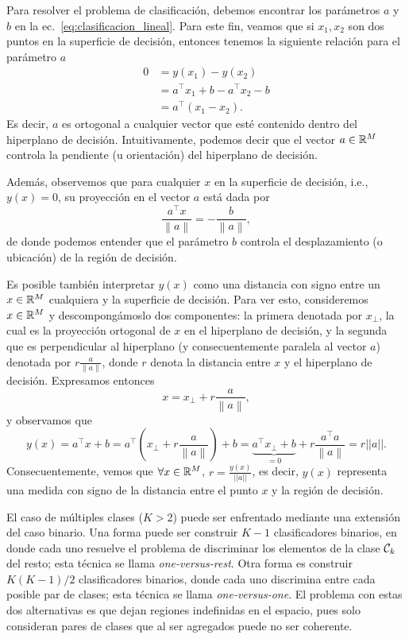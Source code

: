 Para resolver el problema de clasificación, debemos encontrar los parámetros $a$ y $b$ en la ec.~\eqref{eq:clasificacion_lineal}. Para este fin, veamos que si $x_1,x_2$ son dos puntos en la superficie de decisión, entonces tenemos la siguiente relación para el parámetro $a$
\begin{align}
	0 &= y(x_1) - y(x_2) \nonumber\\
	  &= a^\top x_1 + b - a^\top x_2 - b \nonumber\\
	  &= a^\top (x_1-x_2).
\end{align}
Es decir, $a$ es ortogonal a cualquier vector que esté contenido dentro del hiperplano de decisión. Intuitivamente, podemos decir que el vector $a\in{\mathbb R}^M$ controla la pendiente (u orientación) del hiperplano de decisión.

Además, observemos que para cualquier $x$ en la superficie de decisión, i.e., $y(x)=0$,  su proyección en el vector $a$ está dada por  
\begin{equation}
	\frac{a^\top x}{\left \| a \right \|} = -\frac{b}{\left \| a \right \|},
\end{equation}
de donde podemos entender que el parámetro $b$ controla el desplazamiento (o ubicación) de la región de decisión.

Es posible  también interpretar $y(x)$ como una distancia con signo entre un $x\in{\mathbb R}^M$ cualquiera  y la superficie de decisión. Para ver esto, consideremos $x\in{\mathbb R}^M$ y descompongámoslo dos componentes: la primera denotada por $x_{\bot}$, la cual es la proyección ortogonal de $x$ en el hiperplano de  decisión, y la segunda que es perpendicular al hiperplano (y consecuentemente paralela al vector $a$) denotada por $r\frac{a}{\left \| a \right \|}$, donde $r$ denota la distancia entre $x$ y el  hiperplano de  decisión. Expresamos entonces  
\begin{equation}
	x = x_{\bot}+r\frac{a}{\left \| a \right \|},
\end{equation}
y observamos que
\begin{equation}
	y(x) 
	= a^\top x+b 
	=a^\top  \left( x_{\bot} + r\frac{a}{\left \| a \right \|} \right) +b 
	= \underbrace{a^\top x_{\bot} +b }_{=0} +   r\frac{a^\top  a}{\left \| a \right \|}
	= r||a||.
\end{equation}
Consecuentemente, vemos que $\forall x\in{\mathbb R}^M$, $r = \frac{y(x)}{||a||}$,  es decir, $y(x)$ representa una medida con signo de la  distancia entre el punto $x$ y la  región de decisión. 

El caso de múltiples clases ($K>2$) puede ser enfrentado mediante una extensión del caso binario. Una forma puede ser construir $K-1$ clasificadores binarios, en donde cada uno  resuelve el problema de discriminar los elementos de la  clase ${\mathcal C}_k$ del resto; esta técnica se llama \emph{one-versus-rest}. Otra forma es construir $K(K-1)/2$ clasificadores binarios, donde cada uno discrimina entre cada posible par de clases; esta técnica se llama \emph{one-versus-one}. El problema con estas dos alternativas es que dejan  regiones indefinidas en el espacio, pues solo consideran pares de clases que  al ser agregados puede no  ser coherente. 

